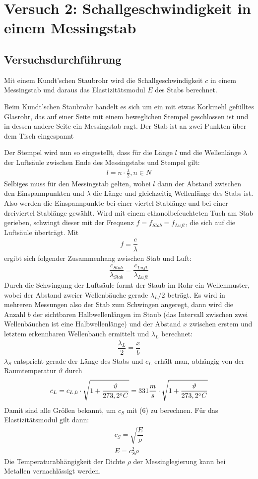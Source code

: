 \documentclass{scrartcl}
\begin{document}
\section{Versuch 2: Schallgeschwindigkeit in einem Messingstab}
\subsection{Versuchsdurchführung}
Mit einem Kundt'schen Staubrohr wird die Schallgeschwindigkeit $c$ in einem Messingstab und daraus das Elastizitätsmodul $E$ des Stabs berechnet.

Beim Kundt'schen Staubrohr handelt es sich um ein mit etwas Korkmehl gefülltes Glasrohr, das auf einer Seite mit einem beweglichen Stempel geschlossen ist und in dessen andere Seite ein Messingstab ragt. Der Stab ist an zwei Punkten über dem Tisch eingespannt

Der Stempel wird nun so eingestellt, dass für die Länge $l$ und die Wellenlänge $\lambda$ der Luftsäule zwischen Ende des Messingstabs und Stempel gilt:
\begin{align}
l = n  \cdot \frac{\lambda}{2}, n \in N
\end{align}
Selbiges muss für den Messingstab gelten, wobei $l$ dann der Abstand zwischen den Einspannpunkten und $\lambda$ die Länge und gleichzeitig Wellenlänge des Stabs ist. Also werden die Einspannpunkte bei einer viertel Stablänge und bei einer dreiviertel Stablänge gewählt.
Wird mit einem ethanolbefeuchteten Tuch am Stab gerieben, schwingt dieser mit der Frequenz $f = f_{Stab} = f_{Luft}$, die sich auf die Luftsäule überträgt. Mit 
\begin{align}
f = \dfrac{c}{\lambda}
\end{align}
ergibt sich folgender Zusammenhang zwischen Stab und Luft:
\begin{align}
\dfrac{c_{Stab}}{\lambda_{Stab}} = \dfrac{c_{Luft}}{\lambda_{Luft}}
\end{align}
Durch die Schwingung der Luftsäule formt der Staub im Rohr ein Wellenmuster, wobei der Abstand zweier Wellenbäuche gerade $\lambda_{L} / 2$ beträgt. 
Es wird in mehreren Messungen also der Stab zum Schwingen angeregt, dann wird die Anzahl $b$ der sichtbaren Halbwellenlängen im Staub (das Intervall zwischen zwei Wellenbäuchen ist eine Halbwellenlänge) und der Abstand $x$ zwischen erstem und letztem erkennbaren Wellenbauch ermittelt und $\lambda_{L}$ berechnet:
\begin{align}
\dfrac{\lambda_{L}}{2} = \dfrac{x}{b}
\end{align}
$\lambda_{S}$ entspricht gerade der Länge des Stabs und $c_{L}$ erhält man, abhängig von der Raumtemperatur $\vartheta$ durch
\begin{align}
c_{L} = c_{L, 0} \cdot \sqrt{1+\dfrac{\vartheta}{273,2 \degree C}} = 331 \dfrac{m}{s} \cdot \sqrt{1+\dfrac{\vartheta}{273,2 \degree C}}
\end{align}
Damit sind alle Größen bekannt, um $c_{S}$ mit (6) zu berechnen. Für das Elastizitätsmodul gilt dann:
\begin{align}
c_{S} = \sqrt{\dfrac{E}{\rho}} \\
E = c_{S}^2 \rho
\end{align}
Die Temperaturabhängigkeit der Dichte $\rho$ der Messinglegierung kann bei Metallen vernachlässigt werden.
\end{document}
